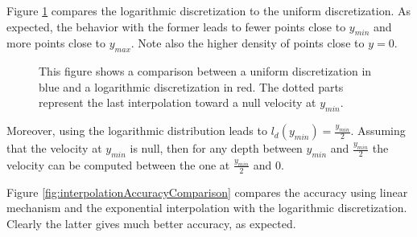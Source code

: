 \documentclass[final]{jcgt}
\begin{document}
Figure \ref{fig:comparisonGrid} compares the logarithmic discretization to the uniform discretization. As expected, the behavior with the former leads to fewer points close to $y_{min}$ and more points close to $y_{max}$.
Note also the higher density of points close to $y=0$.

\begin{figure}[ht]
	\centering
	\hfill
	\caption{This figure shows a comparison between a \textcolor{bleuF}{uniform discretization in blue} and a \textcolor{redF}{logarithmic discretization in red}. The dotted parts represent the last interpolation toward a null velocity at $y_{min}$.}
	\label{fig:comparisonGrid}
\end{figure}

Moreover, using the logarithmic distribution leads to $l_d(y_{min})=\frac{y_{min}}{2}$.
Assuming that the velocity at $y_{min}$ is null, then for any depth between $y_{min}$ and $\frac{y_{min}}{2}$ the velocity can be computed between the one at $\frac{y_{min}}{2}$ and $0$.

Figure \ref{fig:interpolationAccuracyComparison} compares the accuracy using linear mechanism and the exponential interpolation with the logarithmic discretization.
Clearly the latter gives much better accuracy, as expected.
\end{document}
